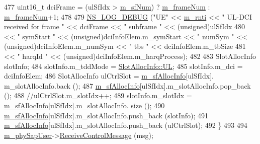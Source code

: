 \begin{DoxyCode}
477                                 uint16\_t dciFrame = (ulSfIdx > \hyperlink{classns3_1_1MmWavePhy_af3d76eb9f3e5e1ff669852d05986c1a3}{m\_sfNum}) ? 
      \hyperlink{classns3_1_1MmWavePhy_a852ce585035a1c12122d2775e64ff38a}{m\_frameNum} : \hyperlink{classns3_1_1MmWavePhy_a852ce585035a1c12122d2775e64ff38a}{m\_frameNum}+1;
478 
479                                 \hyperlink{group__logging_ga413f1886406d49f59a6a0a89b77b4d0a}{NS\_LOG\_DEBUG} (\textcolor{stringliteral}{"UE"} << \hyperlink{classns3_1_1MmWaveUePhy_aae63c66b69de47ac19b4033ecf4bc211}{m\_rnti} << \textcolor{stringliteral}{" UL-DCI received for
       frame "} << dciFrame << \textcolor{stringliteral}{" subframe "} << (\textcolor{keywordtype}{unsigned})ulSfIdx
480                                                      << \textcolor{stringliteral}{" symStart "} << (\textcolor{keywordtype}{unsigned})dciInfoElem.m\_symStart <<
       \textcolor{stringliteral}{" numSym "} << (\textcolor{keywordtype}{unsigned})dciInfoElem.m\_numSym << \textcolor{stringliteral}{" tbs "} << dciInfoElem.m\_tbSize
481                                                      << \textcolor{stringliteral}{" harqId "} << (\textcolor{keywordtype}{unsigned})dciInfoElem.m\_harqProcess);
482 
483                                 SlotAllocInfo slotInfo;
484                                 slotInfo.m\_tddMode = \hyperlink{structns3_1_1SlotAllocInfo_a6cad60db1d39034f1851e2cea625fe5da916b5be54594ead6ed677c570311cad2}{SlotAllocInfo::UL};
485                                 slotInfo.m\_dci = dciInfoElem;
486                                 SlotAllocInfo ulCtrlSlot = \hyperlink{classns3_1_1MmWavePhy_a6e7002b99b8c50976033e0b96523f08c}{m\_sfAllocInfo}[ulSfIdx].
      m\_slotAllocInfo.back ();
487                                 \hyperlink{classns3_1_1MmWavePhy_a6e7002b99b8c50976033e0b96523f08c}{m\_sfAllocInfo}[ulSfIdx].m\_slotAllocInfo.pop\_back ();
488                                 \textcolor{comment}{//ulCtrlSlot.m\_slotIdx++;}
489                                 slotInfo.m\_slotIdx = \hyperlink{classns3_1_1MmWavePhy_a6e7002b99b8c50976033e0b96523f08c}{m\_sfAllocInfo}[ulSfIdx].m\_slotAllocInfo.
      size ();
490                                 \hyperlink{classns3_1_1MmWavePhy_a6e7002b99b8c50976033e0b96523f08c}{m\_sfAllocInfo}[ulSfIdx].m\_slotAllocInfo.push\_back (slotInfo);
491                                 \hyperlink{classns3_1_1MmWavePhy_a6e7002b99b8c50976033e0b96523f08c}{m\_sfAllocInfo}[ulSfIdx].m\_slotAllocInfo.push\_back (ulCtrlSlot);
492                         \}
493 
494                         \hyperlink{classns3_1_1MmWaveUePhy_ada28b24f0029ea9fbe7e02f1fb9c918e}{m\_phySapUser}->\hyperlink{classns3_1_1MmWaveUePhySapUser_aef4c1ae33a2b23ef03df4e109169895c}{ReceiveControlMessage} (msg);

\end{DoxyCode}

